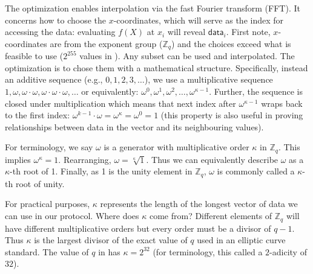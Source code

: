 The optimization enables interpolation via the fast Fourier transform (FFT). It concerns how to choose the \(x\)-coordinates, which will serve as the index for accessing the data: evaluating \(f(X)\) at \(x_i\) will reveal \(\mathsf{data}_i\). First note, \(x\)-coordinates are from the exponent group (\(\mathbb{Z}_q\)) and the choices exceed what is feasible to use (\(2^{255}\) values in \bls). Any subset can be used and interpolated. The optimization is to chose them with a mathematical structure. Specifically, instead an additive sequence (e.g., \(0,1,2,3,\ldots\)), we use a multiplicative sequence
\(1,\omega,\omega\cdot\omega,\omega\cdot\omega\cdot\omega,\ldots\) or equivalently: \(\omega^0,\omega^1,\omega^2,\ldots,\omega^{\kappa-1}\). Further, the sequence is closed under multiplication which means that next index after \(\omega^{\kappa-1}\) wraps back to the first index: \(\omega^{k-1} \cdot \omega = \omega^\kappa = \omega^0=1\) (this property is also useful in proving relationships between data in the vector and its neighbouring values).

For terminology, we say \(\omega\) is a generator with multiplicative order \(\kappa\) in \(\mathbb{Z}_q\). This implies \(\omega^\kappa=1\). Rearranging, \(\omega=\sqrt[\kappa]{1}\). Thus we can equivalently describe \(\omega\) as a \(\kappa\)-th root of 1. Finally, as 1 is the unity element in \(\mathbb{Z}_q\), \(\omega\) is commonly called a \(\kappa\)-th root of unity.

For practical purposes, \(\kappa\) represents the length of the longest vector of data we can use in our protocol. Where does \(\kappa\) come from? Different elements of \(\mathbb{Z}_q\) will have different multiplicative orders but every order must be a divisor of \(q-1\). Thus \(\kappa\) is the largest divisor of the exact value of \(q\) used in an elliptic curve standard. The value of $q$ in \bls has \(\kappa=2^{32}\) (for terminology, this called a \(2\)-adicity of \(32\)).

